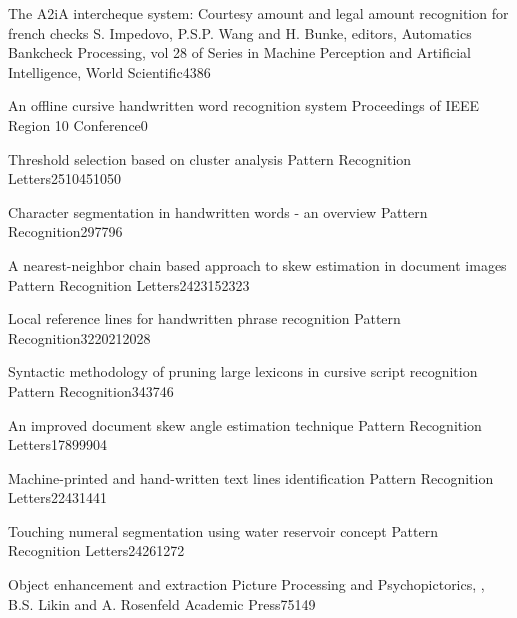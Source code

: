 {The A2iA intercheque system: Courtesy amount and legal amount recognition for french checks}
{S. Impedovo, P.S.P. Wang and H. Bunke, editors, Automatics Bankcheck Processing, vol 28 of Series in Machine Perception and Artificial Intelligence, World Scientific}{}{43}{86}

{An offline cursive handwritten word recognition system}
{Proceedings of IEEE Region 10 Conference}{}{0}{}

{Threshold selection based on cluster analysis}
{Pattern Recognition Letters}{25}{1045}{1050}

{Character segmentation in handwritten words - an overview}
{Pattern Recognition}{29}{77}{96}

{A nearest-neighbor chain based approach to skew estimation in document images}
{Pattern Recognition Letters}{24}{2315}{2323}

{Local reference lines for handwritten phrase recognition}
{Pattern Recognition}{32}{2021}{2028}

{Syntactic methodology of pruning large lexicons in cursive script recognition}
{Pattern Recognition}{34}{37}{46}

{An improved document skew angle estimation technique}
{Pattern Recognition Letters}{17}{899}{904}

{Machine-printed and hand-written text lines identification}
{Pattern Recognition Letters}{22}{431}{441}

{Touching numeral segmentation using water reservoir concept}
{Pattern Recognition Letters}{24}{261}{272}

{Object enhancement and extraction}
{Picture Processing and Psychopictorics, , B.S. Likin and A. Rosenfeld Academic Press}{}{75}{149}


